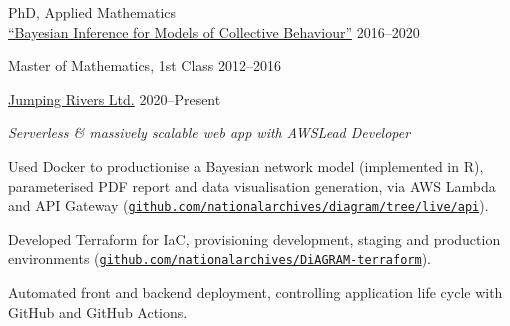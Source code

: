 \documentclass[12pt, a4paper]{article}
\begin{document}

\makecard





%
        {PhD, Applied Mathematics\\
         \href{https://jwalton.info/assets/thesis.pdf}%
              {{\footnotesize{}}``Bayesian Inference for Models of Collective Behaviour''}}%
        {2016--2020}

%
        {Master of Mathematics, 1st Class}%
        {2012--2016}




%
        {\href{https://www.jumpingrivers.com/}{Jumping Rivers Ltd.}}%
        {2020--Present}

\vspace{-1em}


%
       {\emph{Serverless \& massively scalable web app with AWS\hfill{}Lead Developer}

       \begin{adjustwidth}{0em}{3em}

       \sloppy{}Used Docker to productionise a Bayesian network model
       (implemented in R), parameterised PDF report and data visualisation generation,
       via AWS Lambda and API Gateway
       (\href{https://github.com/nationalarchives/diagram/tree/live/api}%
             {\texttt{github.com/nationalarchives/diagram/tree/live/api}}).

       Developed Terraform for IaC, provisioning development, staging and production environments
       (\href{https://github.com/nationalarchives/DiAGRAM-terraform/}%
             {\texttt{github.com/nationalarchives/DiAGRAM-terraform}}).

       Automated front and backend deployment, controlling application life
       cycle with GitHub and GitHub Actions.

       \end{adjustwidth}}%
\end{document}
